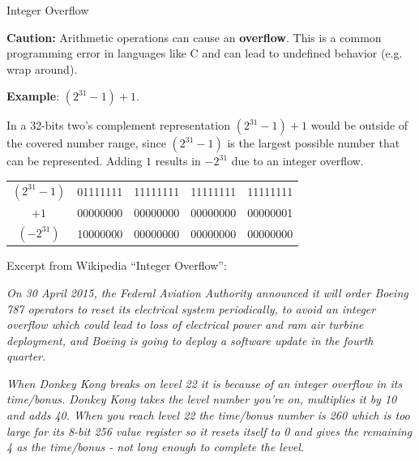 \begin{vbframe}{Integer Overflow}

\textbf{Caution:} Arithmetic operations can cause an \textbf{overflow}.
This is a common programming error in languages like C and can lead to undefined behavior (e.g. wrap around).

\lz

\textbf{Example}: $(2^{31} - 1) + 1$.

In a 32-bits two's complement representation $(2^{31} - 1) + 1$ would be outside of the covered number range, since $(2^{31} - 1)$ is the largest possible number that can be represented. Adding $1$ results in $-2^{31}$ due to an integer overflow.

\lz 

\centering
\begin{tabular}{c:cccc}
$(2^{31} - 1)$ & 01111111 & 11111111 & 11111111 & 11111111 \\
$+ 1$ & 00000000 & 00000000 & 00000000 & 00000001 \\
\hline
$(-2^{31})$ & 10000000 & 00000000 & 00000000 & 00000000 \\
\end{tabular}

\framebreak

Excerpt from Wikipedia \enquote{Integer Overflow}:

\lz

\emph{
On 30 April 2015, the Federal Aviation Authority announced it will order Boeing 787 operators to reset its electrical system periodically, to avoid an integer overflow which could lead to loss of electrical power and ram air turbine deployment, and Boeing is going to deploy a software update in the fourth quarter.}

\lz

\emph{When Donkey Kong breaks on level 22 it is because of an integer overflow in its time/bonus. Donkey Kong takes the level number you're on, multiplies it by 10 and adds 40. When you reach level 22 the time/bonus number is 260 which is too large for its 8-bit 256 value register so it resets itself to 0 and gives the remaining 4 as the time/bonus - not long enough to complete the level.}


\end{vbframe}

